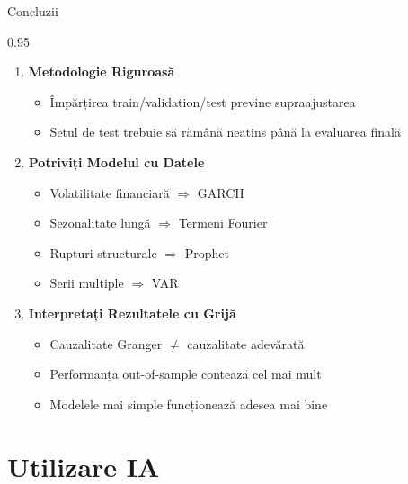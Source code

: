 \documentclass[9pt, aspectratio=169, t]{beamer}
\begin{document}
\begin{frame}{Concluzii}
    \begin{cminipage}{0.95\textwidth}
        \small
        \begin{enumerate}\setlength{\itemsep}{0pt}
            \item \textbf{Metodologie Riguroasă}
            \begin{itemize}\setlength{\itemsep}{0pt}
                \item Împărțirea train/validation/test previne supraajustarea
                \item Setul de test trebuie să rămână neatins până la evaluarea finală
            \end{itemize}

            \vspace{0.2cm}

            \item \textbf{Potriviți Modelul cu Datele}
            \begin{itemize}\setlength{\itemsep}{0pt}
                \item Volatilitate financiară $\Rightarrow$ GARCH
                \item Sezonalitate lungă $\Rightarrow$ Termeni Fourier
                \item Rupturi structurale $\Rightarrow$ Prophet
                \item Serii multiple $\Rightarrow$ VAR
            \end{itemize}

            \vspace{0.2cm}

            \item \textbf{Interpretați Rezultatele cu Grijă}
            \begin{itemize}\setlength{\itemsep}{0pt}
                \item Cauzalitate Granger $\neq$ cauzalitate adevărată
                \item Performanța out-of-sample contează cel mai mult
                \item Modelele mai simple funcționează adesea mai bine
            \end{itemize}
        \end{enumerate}
    \end{cminipage}
\end{frame}

\section{Utilizare IA}
\end{document}
